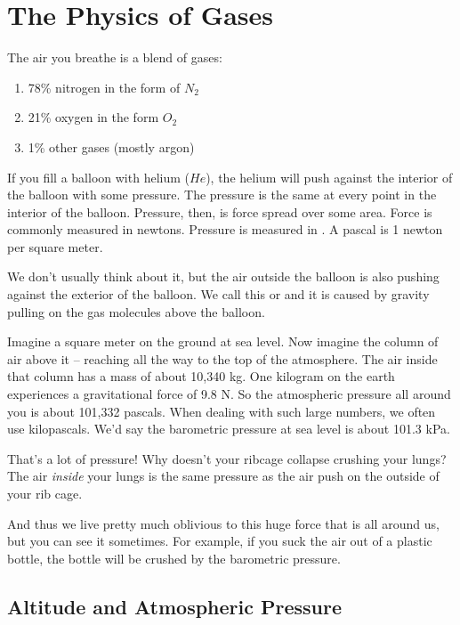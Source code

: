 \chapter{The Physics of Gases}

The air you breathe is a blend of gases:
\begin{enumerate}
\item 78\% nitrogen in the form of $N_2$
\item 21\% oxygen in the form $O_2$
\item 1\% other gases (mostly argon)
\end{enumerate}

If you fill a balloon with helium ($He$),  the helium will push against the interior of the balloon with some pressure.   
The pressure is the same at every point in the interior of the balloon.  Pressure,  then,  is force spread over some area.   
Force is commonly measured in newtons.   Pressure is measured in .  A pascal is 1 newton per square meter.

We don't usually think about it,  but the air outside the balloon is also pushing against the exterior of the balloon.  
We call this  or  and it is caused by gravity pulling on the gas molecules above the balloon.

Imagine a square meter on the ground at sea level.  Now imagine the column of air above it -- reaching all the way to the top of the atmosphere.   
The air inside that column has a mass of about 10,340 kg.  One kilogram on the earth experiences a gravitational force of 9.8 N.   
So the atmospheric pressure all around you is about 101,332 pascals.  
When dealing with such large numbers, we often use kilopascals.  
We'd say the barometric pressure at sea level is about 101.3 kPa.

That's a lot of pressure!  Why doesn't your ribcage collapse crushing your lungs?  The air \emph{inside} your lungs is the same 
pressure as the air push on the outside of your rib cage.  

And thus we live pretty much oblivious to this huge force that is all around us, but you can see it sometimes.  
For example, if you suck the air out of a plastic bottle,   the bottle will be crushed by the barometric pressure.

\section{Altitude and Atmospheric Pressure}

